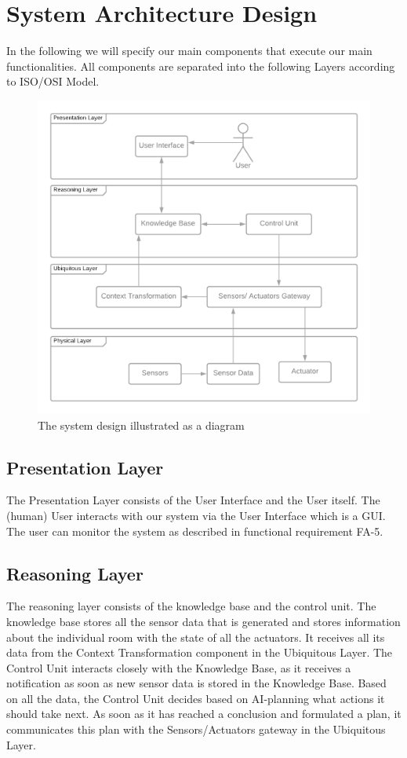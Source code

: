 \documentclass[runningheads]{llncs}
\begin{document}
    \section{System Architecture Design}

    In the following we will specify our main components that execute our main functionalities. All components are separated into the following Layers according to ISO/OSI Model.

    \begin{figure}
        \centering
        \includegraphics[width=\linewidth]{img/system-design.png}
        \caption{The system design illustrated as a diagram}
        \label{fig:system-design}
    \end{figure}

    \subsection{Presentation Layer}
    The Presentation Layer consists of the User Interface and the User itself. The (human) User interacts with our system via the User Interface which is a GUI. The user can monitor the system as described in functional requirement FA-5.

    \subsection{Reasoning Layer}
    The reasoning layer consists of the knowledge base and the control unit. The knowledge base stores all the sensor data that is generated and stores information about the individual room with the state of all the actuators. It receives all its data from the Context Transformation component in the Ubiquitous Layer. The Control Unit interacts closely with the Knowledge Base, as it receives a notification as soon as new sensor data is stored in the Knowledge Base. Based on all the data, the Control Unit decides based on AI-planning what actions it should take next. As soon as it has reached a conclusion and formulated a plan, it communicates this plan with the Sensors/Actuators gateway in the Ubiquitous Layer.
\end{document}
